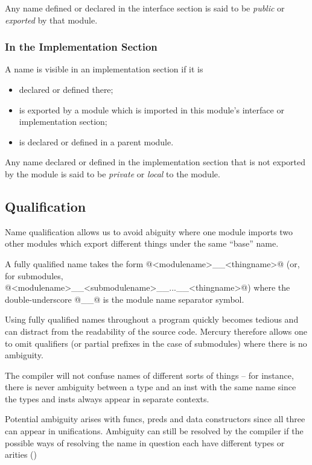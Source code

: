 Any name defined or declared in the interface section is
said to be \emph{public} or \emph{exported} by that module.

\subsubsection{In the Implementation Section}

A name is visible in an implementation section if it is
\begin{itemize}
\item declared or defined there;
\item is exported by a module which is imported in this
  module's interface or implementation section;
\item is declared or defined in a parent module.
\end{itemize}

Any name declared or defined in the implementation section
that is not exported by the module is said to be \emph{private}
or \emph{local} to the module.

\subsection{Qualification}

Name qualification allows us to avoid abiguity where one
module imports two other modules which export different things
under the same ``base'' name.

A fully qualified name takes the form @<modulename>__<thingname>@
(or, for submodules, @<modulename>__<submodulename>__...__<thingname>@)
where the double-underscore @__@ is the module name separator symbol.

Using fully qualified names throughout a program quickly
becomes tedious and can distract from the readability of the
source code.  Mercury therefore allows one to omit qualifiers
(or partial prefixes in the case of submodules) where there is
no ambiguity.

The compiler will not confuse names of different sorts of
things -- for instance, there is never ambiguity between a type
and an inst with the same name since the types and insts
always appear in separate contexts.

Potential ambiguity arises with funcs, preds and data
constructors since all three can appear in unifications.
Ambiguity can still be resolved by the compiler if the
possible ways of resolving the name in question each have
different types or arities ()


